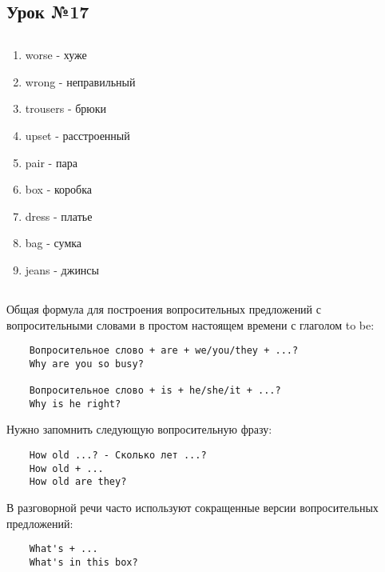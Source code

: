 \subsection{Урок №17}

\subsection*{}
\begin{multicols}{2}
    \begin{enumerate}\setlength{\itemsep}{0pt}
        \item worse - хуже
        \item wrong - неправильный
        \item trousers - брюки
        \item upset - расстроенный
        \item pair - пара
        \item box - коробка
        \item dress - платье
        \item bag - сумка
        \item jeans - джинсы
    \end{enumerate}
\end{multicols}

\subsection*{}
Общая формула для построения вопросительных предложений с вопросительными словами в простом настоящем
времени с глаголом to be:
\begin{verbatim}
    Вопросительное слово + are + we/you/they + ...?
    Why are you so busy?

    Вопросительное слово + is + he/she/it + ...?
    Why is he right?
\end{verbatim}

Нужно запомнить следующую вопросительную фразу:
\begin{verbatim}
    How old ...? - Сколько лет ...?
    How old + ...
    How old are they?
\end{verbatim}

В разговорной речи часто используют сокращенные версии вопросительных предложений:
\begin{verbatim}
    What's + ...
    What's in this box?
\end{verbatim}